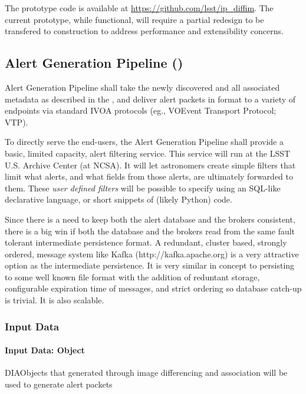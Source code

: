 The prototype code is available at \url{https://github.com/lsst/ip_diffim}. The current prototype, while functional, will require a partial redesign to be transfered to construction to address performance and extensibility concerns.

\clearpage

\subsection{Alert Generation Pipeline (\wbsAP)}

Alert Generation Pipeline shall take the newly discovered \DIASources and all associated metadata as described in the \DPDD, and deliver alert packets in \VOEvent format to a variety of endpoints via standard IVOA protocols (eg., VOEvent Transport Protocol; VTP\@).

To directly serve the end-users, the Alert Generation Pipeline shall provide a basic, limited capacity, alert filtering service. This service will run at the LSST U.S. Archive Center (at NCSA). It will let astronomers create simple filters that limit what alerts, and what fields from those alerts, are ultimately forwarded to them. These \emph{user defined filters} will be possible to specify using an SQL-like declarative language, or short snippets of (likely Python) code.

Since there is a need to keep both the alert database and the brokers consistent, there is a big win if both the database and the brokers read from the same fault tolerant intermediate persistence format.  A redundant, cluster based, strongly ordered, message system like Kafka (http://kafka.apache.org) is a very attractive option as the intermediate persistence.  It is very similar in concept to persisting to some well known file format with the addition of reduntant storage, configurable expiration time of messages, and strict ordering so database catch-up is trivial.  It is also scalable.


\subsubsection{Input Data}

\paragraph{Input Data: Object}

DIAObjects that generated through image differencing and association will be used to generate alert packets 

